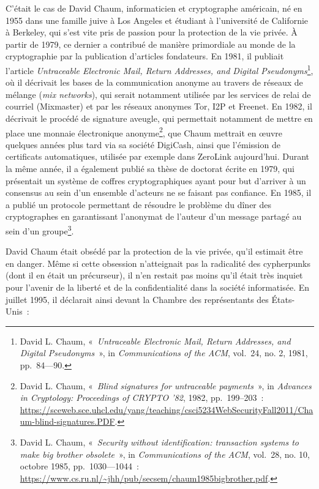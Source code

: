 \documentclass[
  a5paper,
  smalldemyvopaper,10pt,twoside,onecolumn,openright,extrafontsizes,hidelinks]{memoir}
\begin{document}
C'était le cas de David Chaum, informaticien et cryptographe américain,
né en 1955 dans une famille juive à Los Angeles et étudiant à
l'université de Californie à Berkeley, qui s'est vite pris de passion
pour la protection de la vie privée. À partir de 1979, ce dernier a
contribué de manière primordiale au monde de la cryptographie par la
publication d'articles fondateurs. En 1981, il publiait l'article
\emph{Untraceable Electronic Mail, Return Addresses, and Digital
Pseudonyms}\footnote{David L. Chaum, «~\emph{Untraceable Electronic
  Mail, Return Addresses, and Digital Pseudonyms}~», in
  \emph{Communications of the ACM}, vol.~24, no. 2, 1981, pp.~84---90.},
où il décrivait les bases de la communication anonyme au travers de
réseaux de mélange (\emph{mix networks}), qui serait notamment utilisée
par les services de relai de courriel (Mixmaster) et par les réseaux
anonymes Tor, I2P et Freenet. En 1982, il décrivait le procédé de
signature aveugle, qui permettait notamment de mettre en place une
monnaie électronique anonyme\footnote{David L. Chaum, «~\emph{Blind
  signatures for untraceable payments}~», in \emph{Advances in
  Cryptology: Proceedings of CRYPTO '82}, 1982, pp.~199--203~:
  \url{https://sceweb.sce.uhcl.edu/yang/teaching/csci5234WebSecurityFall2011/Chaum-blind-signatures.PDF}.},
que Chaum mettrait en œuvre quelques années plus tard via sa société
DigiCash, ainsi que l'émission de certificats automatiques, utilisée par
exemple dans ZeroLink aujourd'hui. Durant la même année, il a également
publié sa thèse de doctorat écrite en 1979, qui présentait un système de
coffres cryptographiques ayant pour but d'arriver à un consensus au sein
d'un ensemble d'acteurs ne se faisant pas confiance. En 1985, il a
publié un protocole permettant de résoudre le problème du dîner des
cryptographes en garantissant l'anonymat de l'auteur d'un message
partagé au sein d'un groupe\footnote{David L. Chaum, «~\emph{Security
  without identification: transaction systems to make big brother
  obsolete}~», in \emph{Communications of the ACM}, vol.~28, no. 10,
  octobre 1985, pp.~1030---1044~:
  \url{https://www.cs.ru.nl/~jhh/pub/secsem/chaum1985bigbrother.pdf}.}.

David Chaum était obsédé par la protection de la vie privée, qu'il
estimait être en danger. Même si cette obsession n'atteignait pas la
radicalité des cypherpunks (dont il en était un précurseur), il n'en
restait pas moins qu'il était très inquiet pour l'avenir de la liberté
et de la confidentialité dans la société informatisée. En juillet 1995,
il déclarait ainsi devant la Chambre des représentants des États-Unis~:
\end{document}
